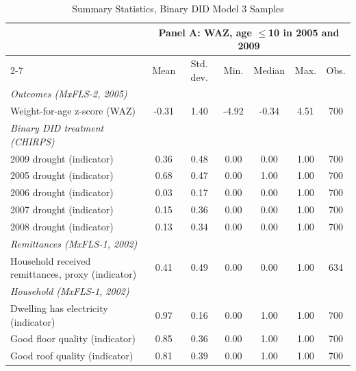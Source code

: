 \documentclass[12pt]{article}
\begin{document}
\begin{longtable}{l*{6}{c}}
\caption{Summary Statistics, Binary DID Model 3 Samples}\\
\toprule
 & \multicolumn{6}{c}{Panel A: WAZ, age \ensuremath{\le}10 in 2005 and 2009}\\
\cmidrule(lr){2-7}
                    &        Mean&   Std. dev.&        Min.&      Median&        Max.&        Obs.\\
\midrule
\textit{Outcomes (MxFLS-2, 2005)}&            &            &            &            &            &            \\
Weight-for-age z-score (WAZ)&       -0.31&        1.40&       -4.92&       -0.34&        4.51&         700\\
\addlinespace[6pt]\textit{Binary DID treatment (CHIRPS)}&            &            &            &            &            &            \\
2009 drought (indicator)&        0.36&        0.48&        0.00&        0.00&        1.00&         700\\
2005 drought (indicator)&        0.68&        0.47&        0.00&        1.00&        1.00&         700\\
2006 drought (indicator)&        0.03&        0.17&        0.00&        0.00&        1.00&         700\\
2007 drought (indicator)&        0.15&        0.36&        0.00&        0.00&        1.00&         700\\
2008 drought (indicator)&        0.13&        0.34&        0.00&        0.00&        1.00&         700\\
\addlinespace[6pt]\textit{Remittances (MxFLS-1, 2002)}&            &            &            &            &            &            \\
Household received remittances, proxy (indicator)&        0.41&        0.49&        0.00&        0.00&        1.00&         634\\
\addlinespace[6pt]\textit{Household (MxFLS-1, 2002)}&            &            &            &            &            &            \\
Dwelling has electricity (indicator)&        0.97&        0.16&        0.00&        1.00&        1.00&         700\\
Good floor quality (indicator)&        0.85&        0.36&        0.00&        1.00&        1.00&         700\\
Good roof quality (indicator)&        0.81&        0.39&        0.00&        1.00&        1.00&         700\\

\end{longtable}
\end{document}
